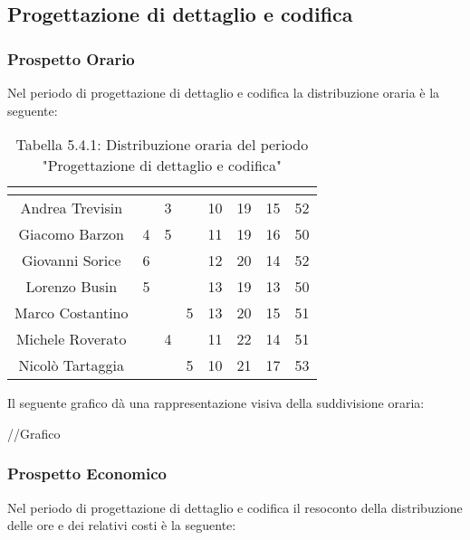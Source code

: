 \subsection{Progettazione di dettaglio e codifica}

\subsubsection{Prospetto Orario}
Nel periodo di progettazione di dettaglio e codifica la distribuzione oraria è la seguente:

\renewcommand{\arraystretch}{1.5}
\begin{table}[H]
\begin{center}
\begin{tabular}{|c|c|c|c|c|c|c|c|}
\hline
\rowcolor{title_row}
\textbf{\color{title_text}{Nome}} & \textbf{\color{title_text}{Resp.}} & \textbf{\color{title_text}{Ammi.}} & \textbf{\color{title_text}{Analist.}} & \textbf{\color{title_text}{Progett.}} & \textbf{\color{title_text}{Program.}} & \textbf{\color{title_text}{Verific.}} & \textbf{\color{title_text}{Totale}} \\ \hline
Andrea Trevisin  & & 3 & & 10 & 19 & 15 & 52  \\ \hline
Giacomo Barzon   & 4 & 5 & & 11 & 19 & 16 & 50 \\ \hline
Giovanni Sorice  & 6 & & & 12 & 20 & 14 & 52  \\ \hline
Lorenzo Busin    & 5 & & & 13 & 19 & 13 & 50  \\ \hline
Marco Costantino & & & 5 & 13 & 20 & 15 & 51 \\ \hline
Michele Roverato & & 4 & & 11 & 22 & 14 & 51  \\ \hline
Nicolò Tartaggia & & & 5 & 10 & 21 & 17 & 53  \\ \hline
\end{tabular}
\caption{Tabella 5.4.1: Distribuzione oraria del periodo "Progettazione di dettaglio e codifica"\label{}}
\end{center}
\end{table}
\renewcommand{\arraystretch}{1}

Il seguente grafico dà una rappresentazione visiva della suddivisione oraria: \\
\begin{center}
//Grafico
\end{center}


\subsubsection{Prospetto Economico}
Nel periodo di progettazione di dettaglio e codifica il resoconto della distribuzione delle ore e dei relativi costi è la seguente:


